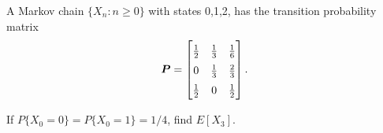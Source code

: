 \begin{problem}{4.5}
  A Markov chain $\{X_n: n \geq 0\}$ with states 0,1,2, has the transition
  probability matrix
  \begin{align*}
    \renewcommand\arraystretch{1.5}
    \boldsymbol{P} =
    \begin{bmatrix}
      \frac{1}{2} & \frac{1}{3} & \frac{1}{6} \\
      0 & \frac{1}{3} & \frac{2}{3} \\
      \frac{1}{2} & 0 & \frac{1}{2} \\
    \end{bmatrix}.
  \end{align*}

  If $P\{X_0 = 0\} = P\{X_0 = 1\} = 1/4$, find $E[X_3]$.
\end{problem}

